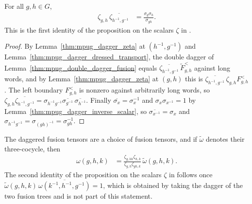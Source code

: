 \begin{lemma}
    \label{thm:mpug_dagger_zeta_relation}
    \leanok
    For all $g,h\in G$,
    \begin{align}
        \zeta_{g,h}\,\overline{\zeta_{h^{-1},g^{-1}}}
         & =\frac{\sigma_g\sigma_h}{\sigma_{gh}}.
    \end{align}
    This is the first identity of the proposition on the scalars $\zeta$ in
    \cite[lines~1570--1678]{FrancoRubio2025MPUGauging}.
\end{lemma}

\begin{proof}\leanok
    By Lemma~\ref{thm:mpug_dagger_zeta} at $(h^{-1},g^{-1})$ and
    Lemma~\ref{thm:mpug_dagger_dressed_transport}, the double dagger of
    Lemma~\ref{thm:mpug_double_dagger_fusion} equals
    $\overline{\zeta_{h^{-1},g^{-1}}}\,\widetilde F^<_{g,h}$ against long words, and
    by Lemma~\ref{thm:mpug_dagger_zeta} at $(g,h)$ this is
    $\overline{\zeta_{h^{-1},g^{-1}}}\,\zeta_{g,h}F^<_{g,h}$. The left boundary
    $F^<_{g,h}$ is nonzero against arbitrarily long words, so
    $\zeta_{g,h}\overline{\zeta_{h^{-1},g^{-1}}}
        =\sigma_{h^{-1}g^{-1}}\overline{\sigma_{g^{-1}}}\,\overline{\sigma_{h^{-1}}}$.
    Finally $\overline{\sigma_x}=\sigma_x^{-1}$ and
    $\sigma_x\sigma_{x^{-1}}=1$ by Lemma~\ref{thm:mpug_dagger_inverse_scalar},
    so $\overline{\sigma_{x^{-1}}}=\sigma_x$ and
    $\sigma_{h^{-1}g^{-1}}=\sigma_{(gh)^{-1}}=\sigma_{gh}^{-1}$.
\end{proof}

\begin{lemma}
    \label{thm:mpug_dagger_omega_gauge}
    \leanok
    The daggered fusion tensors are a choice of fusion tensors, and if
    $\widetilde\omega$ denotes their three-cocycle, then
    \begin{align}
        \omega(g,h,k) & =\frac{\zeta_{g,hk}\zeta_{h,k}}{\zeta_{g,h}\zeta_{gh,k}}\,
        \widetilde\omega(g,h,k).
    \end{align}
    The second identity of the proposition on the scalars $\zeta$ in
    \cite[lines~1570--1678]{FrancoRubio2025MPUGauging} follows once
    $\widetilde\omega(g,h,k)\,\overline{\omega(k^{-1},h^{-1},g^{-1})}=1$, which
    is obtained by taking the dagger of the two fusion trees and is not part of
    this statement.
\end{lemma}

